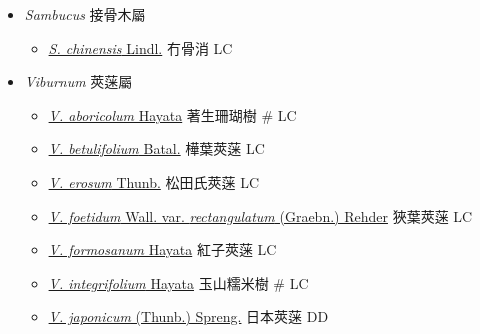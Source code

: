 
  \begin{itemize}
 \item[] \textit{Sambucus} 接骨木屬
                                
  \begin{itemize}
        \item[] \href{http://www.theplantlist.org/tpl1.1/search?q=Sambucus+chinensis}{\textit{S. chinensis} Lindl.}   冇骨消   LC
  \end{itemize}
 \item[] \textit{Viburnum} 莢蒾屬
                                
  \begin{itemize}
        \item[] \href{http://www.theplantlist.org/tpl1.1/search?q=Viburnum+aboricolum}{\textit{V. aboricolum} Hayata}   著生珊瑚樹  \# LC
        \item[] \href{http://www.theplantlist.org/tpl1.1/search?q=Viburnum+betulifolium}{\textit{V. betulifolium} Batal.}   樺葉莢蒾   LC
        \item[] \href{http://www.theplantlist.org/tpl1.1/search?q=Viburnum+erosum}{\textit{V. erosum} Thunb.}   松田氏莢蒾   LC
        \item[] \href{http://www.theplantlist.org/tpl1.1/search?q=Viburnum+foetidum+var.+rectangulatum}{\textit{V. foetidum} Wall. var. \textit{rectangulatum} (Graebn.) Rehder}   狹葉莢蒾   LC
        \item[] \href{http://www.theplantlist.org/tpl1.1/search?q=Viburnum+formosanum}{\textit{V. formosanum} Hayata}   紅子莢蒾   LC
        \item[] \href{http://www.theplantlist.org/tpl1.1/search?q=Viburnum+integrifolium}{\textit{V. integrifolium} Hayata}   玉山糯米樹  \# LC
        \item[] \href{http://www.theplantlist.org/tpl1.1/search?q=Viburnum+japonicum}{\textit{V. japonicum} (Thunb.) Spreng.}   日本莢蒾   DD

\end{itemize}
\end{itemize}
